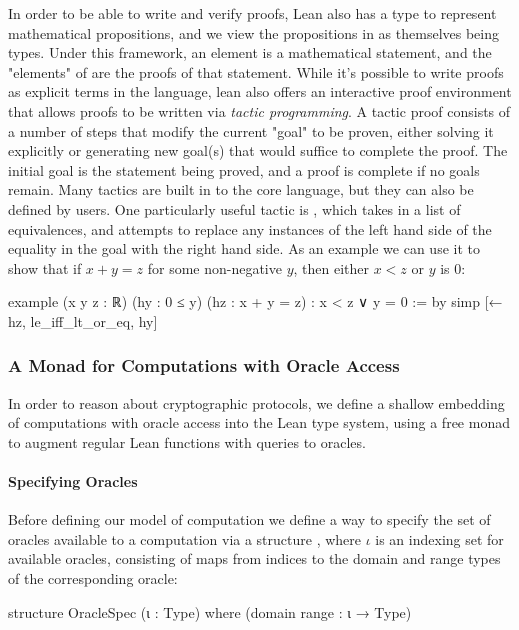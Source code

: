 In order to be able to write and verify proofs, Lean also has a type  to represent mathematical propositions, and we view the propositions in  as themselves being types.
Under this framework, an element  is a mathematical statement, and the "elements" of  are the proofs of that statement.  While it's possible to write proofs as explicit terms in the language, lean also offers an interactive proof environment that allows proofs to be written via \textit{tactic programming}.
A tactic proof consists of a number of steps that modify the current "goal" to be proven, either solving it explicitly or generating new goal(s) that would suffice to complete the proof.
The initial goal is the statement being proved, and a proof is complete if no goals remain.
Many tactics are built in to the core language, but they can also be defined by users.
One particularly useful tactic is , which takes in a list of equivalences, and attempts to replace any instances of the left hand side of the equality in the goal with the right hand side.
As an example we can use it to show that if $x + y = z$ for some non-negative $y$, then either $x < z$ or $y$ is $0$:

\begin{leancode}
  example (x y z : ℝ) (hy : 0 ≤ y)
      (hz : x + y = z) : x < z ∨ y = 0 :=
    by simp [← hz, le_iff_lt_or_eq, hy]
\end{leancode}

\subsubsection{A Monad for Computations with Oracle Access} \label{OracleComp}
In order to reason about cryptographic protocols, we define a shallow embedding of computations with oracle access into the Lean type system, using a free monad to augment regular Lean functions with queries to oracles.

\paragraph{Specifying Oracles}
Before defining our model of computation we define a way to specify the set of oracles available to a computation via a structure , where $\iota$ is an indexing set for available oracles, consisting of maps from indices to the domain and range types of the corresponding oracle:
\begin{leancode}
  structure OracleSpec (ι : Type) where (domain range : ι → Type)
\end{leancode}

